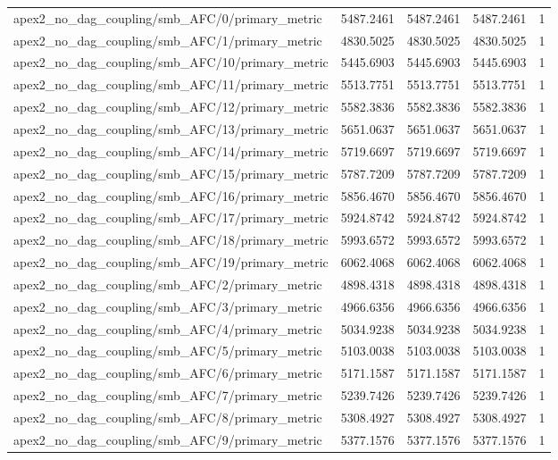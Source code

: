 \begin{table}[h]
\begin{tabular}{lrrrr}
apex2_no_dag_coupling/smb_AFC/0/primary_metric & 5487.2461 & 5487.2461 & 5487.2461 & 1 \\
apex2_no_dag_coupling/smb_AFC/1/primary_metric & 4830.5025 & 4830.5025 & 4830.5025 & 1 \\
apex2_no_dag_coupling/smb_AFC/10/primary_metric & 5445.6903 & 5445.6903 & 5445.6903 & 1 \\
apex2_no_dag_coupling/smb_AFC/11/primary_metric & 5513.7751 & 5513.7751 & 5513.7751 & 1 \\
apex2_no_dag_coupling/smb_AFC/12/primary_metric & 5582.3836 & 5582.3836 & 5582.3836 & 1 \\
apex2_no_dag_coupling/smb_AFC/13/primary_metric & 5651.0637 & 5651.0637 & 5651.0637 & 1 \\
apex2_no_dag_coupling/smb_AFC/14/primary_metric & 5719.6697 & 5719.6697 & 5719.6697 & 1 \\
apex2_no_dag_coupling/smb_AFC/15/primary_metric & 5787.7209 & 5787.7209 & 5787.7209 & 1 \\
apex2_no_dag_coupling/smb_AFC/16/primary_metric & 5856.4670 & 5856.4670 & 5856.4670 & 1 \\
apex2_no_dag_coupling/smb_AFC/17/primary_metric & 5924.8742 & 5924.8742 & 5924.8742 & 1 \\
apex2_no_dag_coupling/smb_AFC/18/primary_metric & 5993.6572 & 5993.6572 & 5993.6572 & 1 \\
apex2_no_dag_coupling/smb_AFC/19/primary_metric & 6062.4068 & 6062.4068 & 6062.4068 & 1 \\
apex2_no_dag_coupling/smb_AFC/2/primary_metric & 4898.4318 & 4898.4318 & 4898.4318 & 1 \\
apex2_no_dag_coupling/smb_AFC/3/primary_metric & 4966.6356 & 4966.6356 & 4966.6356 & 1 \\
apex2_no_dag_coupling/smb_AFC/4/primary_metric & 5034.9238 & 5034.9238 & 5034.9238 & 1 \\
apex2_no_dag_coupling/smb_AFC/5/primary_metric & 5103.0038 & 5103.0038 & 5103.0038 & 1 \\
apex2_no_dag_coupling/smb_AFC/6/primary_metric & 5171.1587 & 5171.1587 & 5171.1587 & 1 \\
apex2_no_dag_coupling/smb_AFC/7/primary_metric & 5239.7426 & 5239.7426 & 5239.7426 & 1 \\
apex2_no_dag_coupling/smb_AFC/8/primary_metric & 5308.4927 & 5308.4927 & 5308.4927 & 1 \\
apex2_no_dag_coupling/smb_AFC/9/primary_metric & 5377.1576 & 5377.1576 & 5377.1576 & 1 \\

\end{tabular}
\end{table}
